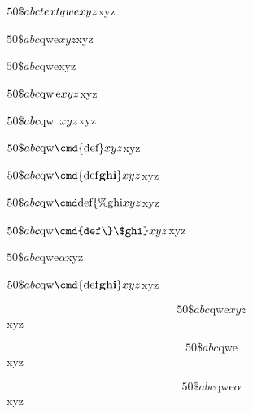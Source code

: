 % 
%

\newcommand{\abc}{def}
\renewcommand{\ghi}{jkl}


$50 \$abc\\text{qwe}xyz$xyz   \par

$50 \$abc\text{qwe}xyz$xyz   \par
$50 \$abc\text{qwe}$xyz      \par
$50 \$abc\mbox{qw\,e}xyz$xyz   \par
$50 \$abc\mbox{qw\enskip}xyz$xyz   \par
$50 \$abc\text{qw\cmd{def}}xyz$xyz   \par
$50 \$abc\text{qw\cmd{def\textbf{ghi}}}xyz$xyz   \par
$50 \$abc\text{qw\cmd{def\{\%ghi}}xyz$xyz   \par
$50 \$abc\text{qw\cmd{def\}\$ghi}}xyz$xyz   \par
$50 \$abc\text{qwe}\alpha$xyz   \par

$50 \$abc\text{qw%
                    \cmd{def\textbf{ghi}}}xyz$xyz   \par
                    
$$50 \$abc\text{qwe}xyz$$xyz   \par
$$50 \$abc\text{qwe}$$xyz      \par
$$50 \$abc\text{qwe}\alpha$$xyz      \par

